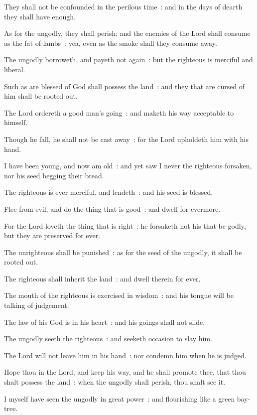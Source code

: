 They shall not be confounded in the perilous time~: and in the days of dearth they shall have enough.\par
{}As for the ungodly, they shall perish; and the enemies of the Lord shall consume as the fat of lambs~: yea, even as the smoke shall they consume away.\par
{}The ungodly borroweth, and payeth not again~: but the righteous is merciful and liberal.\par
{}Such as are blessed of God shall possess the land~: and they that are cursed of him shall be rooted out.\par
{}The Lord ordereth a good man's going~: and maketh his way acceptable to himself.\par
{}Though he fall, he shall not be cast away~: for the Lord upholdeth him with his hand.\par
{}I have been young, and now am old~: and yet saw I never the righteous forsaken, nor his seed begging their bread.\par
{}The righteous is ever merciful, and lendeth~: and his seed is blessed.\par
{}Flee from evil, and do the thing that is good~: and dwell for evermore.\par
{}For the Lord loveth the thing that is right~: he forsaketh not his that be godly, but they are preserved for ever.\par
{}The unrighteous shall be punished~: as for the seed of the ungodly, it shall be rooted out.\par
{}The righteous shall inherit the land~: and dwell therein for ever.\par
{}The mouth of the righteous is exercised in wisdom~: and his tongue will be talking of judgement.\par
{}The law of his God is in his heart~: and his goings shall not slide.\par
{}The ungodly seeth the righteous~: and seeketh occasion to slay him.\par
{}The Lord will not leave him in his hand~: nor condemn him when he is judged.\par
{}Hope thou in the Lord, and keep his way, and he shall promote thee, that thou shalt possess the land~: when the ungodly shall perish, thou shalt see it.\par
{}I myself have seen the ungodly in great power~: and flourishing like a green bay-tree.\par
